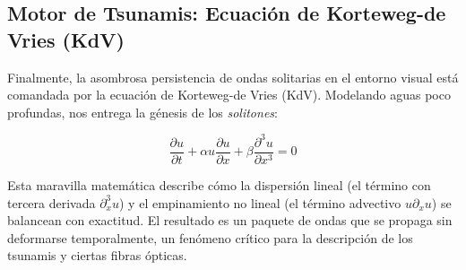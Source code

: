 \documentclass[12pt]{article}
\begin{document}
\subsection{Motor de Tsunamis: Ecuación de Korteweg-de Vries (KdV)}
Finalmente, la asombrosa persistencia de ondas solitarias en el entorno visual está comandada por la ecuación de Korteweg-de Vries (KdV). Modelando aguas poco profundas, nos entrega la génesis de los \textit{solitones}:

\begin{equation}
\frac{\partial u}{\partial t} + \alpha u \frac{\partial u}{\partial x} + \beta \frac{\partial^3 u}{\partial x^3} = 0
\end{equation}

Esta maravilla matemática describe cómo la dispersión lineal (el término con tercera derivada $\partial^3_x u$) y el empinamiento no lineal (el término advectivo $u \partial_x u$) se balancean con exactitud. El resultado es un paquete de ondas que se propaga sin deformarse temporalmente, un fenómeno crítico para la descripción de los tsunamis y ciertas fibras ópticas.
\end{document}
